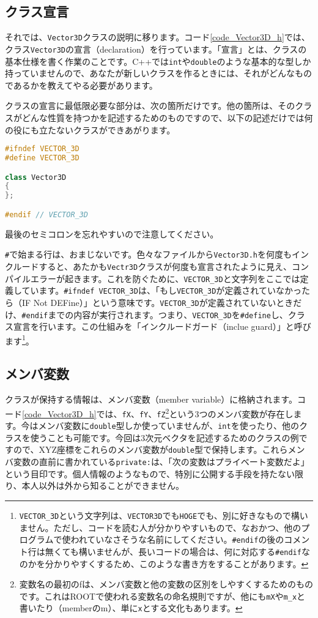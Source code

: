 \subsection{クラス宣言}
それでは、\texttt{Vector3D}クラスの説明に移ります。コード\ref{code_Vector3D_h}では、クラス\texttt{Vector3D}の宣言（declaration）を行っています。「宣言」とは、クラスの基本仕様を書く作業のことです。C++では\texttt{int}や\texttt{double}のような基本的な型しか持っていませんので、あなたが新しいクラスを作るときには、それがどんなものであるかを教えてやる必要があります。

クラスの宣言に最低限必要な部分は、次の箇所だけです。他の箇所は、そのクラスがどんな性質を持つかを記述するためのものですので、以下の記述だけでは何の役にも立たないクラスができあがります。
\begin{lstlisting}[language=c++]
#ifndef VECTOR_3D
#define VECTOR_3D

class Vector3D 
{ 
};

#endif // VECTOR_3D 
\end{lstlisting}
最後のセミコロンを忘れやすいので注意してください。

\texttt{\#}で始まる行は、おまじないです。色々なファイルから\texttt{Vector3D.h}を何度もインクルードすると、あたかも\texttt{Vectr3D}クラスが何度も宣言されたように見え、コンパイルエラーが起きます。これを防ぐために、\texttt{VECTOR\_3D}と文字列をここでは定義しています。\texttt{\#ifndef VECTOR\_3D}は、「もし\texttt{VECTOR\_3D}が定義されていなかったら（IF Not DEFine）」という意味です。\texttt{VECTOR\_3D}が定義されていないときだけ、\texttt{\#endif}までの内容が実行されます。つまり、\texttt{VECTOR\_3D}を\texttt{\#define}し、クラス宣言を行います。この仕組みを「インクルードガード（inclue guard）」と呼びます\footnote{\texttt{VECTOR\_3D}という文字列は、\texttt{VECTOR3D}でも\texttt{HOGE}でも、別に好きなもので構いません。ただし、コードを読む人が分かりやすいもので、なおかつ、他のプログラムで使われていなさそうな名前にしてください。\texttt{\#endif}の後のコメント行は無くても構いませんが、長いコードの場合は、何に対応する\texttt{\#endif}なのかを分かりやすくするため、このような書き方をすることがあります。}。

\subsection{メンバ変数}
\label{subsec:メンバ変数}
クラスが保持する情報は、メンバ変数（member variable）に格納されます。コード\ref{code_Vector3D_h}では、\texttt{fX}、\texttt{fY}、\texttt{fZ}\footnote{変数名の最初のfは、メンバ変数と他の変数の区別をしやすくするためのものです。これはROOTで使われる変数名の命名規則ですが、他にも\texttt{mX}や\texttt{m\_x}と書いたり（memberのm）、単に\texttt{x}とする文化もあります。}という3つのメンバ変数が存在します。今はメンバ変数に\texttt{double}型しか使っていませんが、\texttt{int}を使ったり、他のクラスを使うことも可能です。今回は3次元ベクタを記述するためのクラスの例ですので、XYZ座標をこれらのメンバ変数が\texttt{double}型で保持します。これらメンバ変数の直前に書かれている\texttt{private:}は、「次の変数はプライベート変数だよ」という目印です。個人情報のようなもので、特別に公開する手段を持たない限り、本人以外は外から知ることができません。

